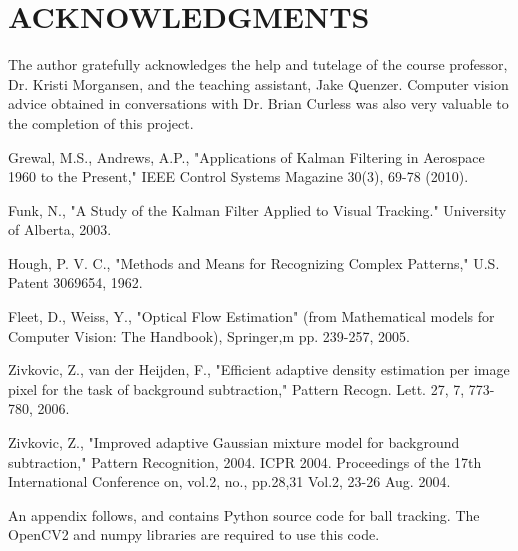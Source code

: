 \documentclass[letterpaper, 10 pt, conference]{ieeeconf}  %
\begin{document}
\section{ACKNOWLEDGMENTS}

The author gratefully acknowledges the help and tutelage of the course professor, Dr. Kristi Morgansen, and the teaching assistant, Jake Quenzer. Computer vision advice obtained in conversations with Dr. Brian Curless was also very valuable to the completion of this project.


\begin{thebibliography}{99}

Grewal, M.S., Andrews, A.P., "Applications of Kalman Filtering in Aerospace 1960 to the Present," IEEE Control Systems Magazine 30(3), 69-78 (2010).

Funk, N., "A Study of the Kalman Filter Applied to Visual Tracking." University of Alberta, 2003.

Hough, P. V. C., "Methods and Means for Recognizing Complex Patterns," U.S. Patent 3069654, 1962.

Fleet, D., Weiss, Y., "Optical Flow Estimation" (from Mathematical models for Computer Vision: The Handbook), Springer,m pp. 239-257, 2005.

Zivkovic, Z., van der Heijden, F., "Efficient adaptive density estimation per image pixel for the task of background subtraction," Pattern Recogn. Lett. 27, 7, 773-780, 2006.

Zivkovic, Z., "Improved adaptive Gaussian mixture model for background subtraction," Pattern Recognition, 2004. ICPR 2004. Proceedings of the 17th International Conference on, vol.2, no., pp.28,31 Vol.2, 23-26 Aug. 2004.

\end{thebibliography}

\clearpage

An appendix follows, and contains Python source code for ball tracking. The OpenCV2 and numpy libraries are required to use this code.
\end{document}
